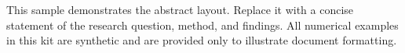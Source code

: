 This sample demonstrates the abstract layout. Replace it with a concise statement of the research question, method, and findings. All numerical examples in this kit are synthetic and are provided only to illustrate document formatting.
